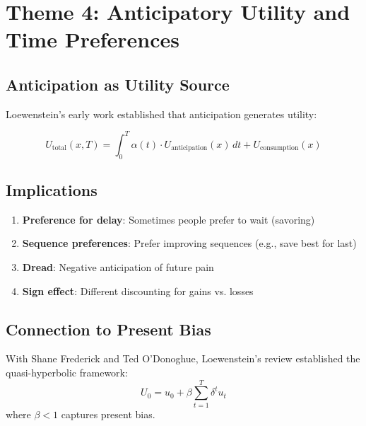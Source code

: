 \section{Theme 4: Anticipatory Utility and Time Preferences}
\label{sec:lo-time}

\subsection{Anticipation as Utility Source}

Loewenstein's early work \citep{loewenstein1987emotions} established that anticipation generates utility:

\begin{equation}
U_{\text{total}}(x, T) = \int_0^T \alpha(t) \cdot U_{\text{anticipation}}(x) \, dt + U_{\text{consumption}}(x)
\end{equation}

\subsection{Implications}

\begin{enumerate}[nosep]
\item \textbf{Preference for delay}: Sometimes people prefer to wait (savoring)
\item \textbf{Sequence preferences}: Prefer improving sequences (e.g., save best for last)
\item \textbf{Dread}: Negative anticipation of future pain
\item \textbf{Sign effect}: Different discounting for gains vs. losses
\end{enumerate}

\subsection{Connection to Present Bias}

With Shane Frederick and Ted O'Donoghue, Loewenstein's review \citep{frederick2002time} established the quasi-hyperbolic framework:
\begin{equation}
U_0 = u_0 + \beta \sum_{t=1}^T \delta^t u_t
\end{equation}
where $\beta < 1$ captures present bias.


